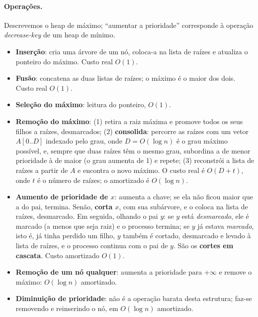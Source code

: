 \paragraph{Operações.} Descrevemos o heap de máximo; ``aumentar a prioridade'' corresponde à operação \emph{decrease-key} de um heap de mínimo.
\begin{itemize}
  \item \textbf{Inserção}: cria uma árvore de um nó, coloca-a na lista de raízes e atualiza o ponteiro do máximo. Custo real $O(1)$.
  \item \textbf{Fusão}: concatena as duas listas de raízes; o máximo é o maior dos dois. Custo real $O(1)$.
  \item \textbf{Seleção do máximo}: leitura do ponteiro, $O(1)$.
  \item \textbf{Remoção do máximo}: (1) retira a raiz máxima e promove todos os seus filhos a raízes, desmarcados; (2) \textbf{consolida}: percorre as raízes com um vetor $A[0..D]$ indexado pelo grau, onde $D=O(\log n)$ é o grau máximo possível, e, sempre que duas raízes têm o mesmo grau, subordina a de menor prioridade à de maior (o grau aumenta de 1) e repete; (3) reconstrói a lista de raízes a partir de $A$ e encontra o novo máximo. O custo real é $O(D+t)$, onde $t$ é o número de raízes; o amortizado é $O(\log n)$.
  \item \textbf{Aumento de prioridade de $x$}: aumenta a chave; se ela não ficou maior que a do pai, termina. Senão, \textbf{corta} $x$, com sua subárvore, e o coloca na lista de raízes, desmarcado. Em seguida, olhando o pai $y$: se $y$ está \emph{desmarcado}, ele é marcado (a menos que seja raiz) e o processo termina; se $y$ já estava \emph{marcado}, isto é, já tinha perdido um filho, $y$ também é cortado, desmarcado e levado à lista de raízes, e o processo continua com o pai de $y$. São os \textbf{cortes em cascata}. Custo amortizado $O(1)$.
  \item \textbf{Remoção de um nó qualquer}: aumenta a prioridade para $+\infty$ e remove o máximo: $O(\log n)$ amortizado.
  \item \textbf{Diminuição de prioridade}: não é a operação barata desta estrutura; faz-se removendo e reinserindo o nó, em $O(\log n)$ amortizado.
\end{itemize}

